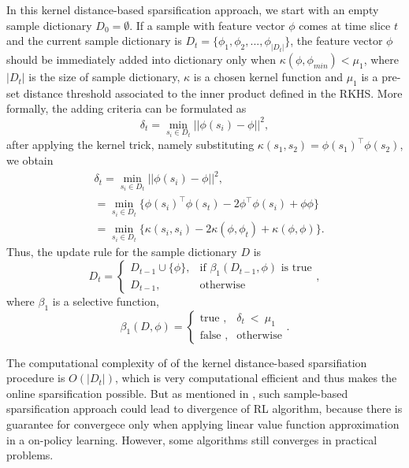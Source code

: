 \documentclass[conference]{IEEEtran}
\begin{document}
In this kernel distance-based sparsification approach, we start with an empty sample dictionary $D_0 = \emptyset$. If a sample with feature vector $\phi$ comes at time slice $t$ and the current sample dictionary is $D_t = \{\phi_1, \phi_2,..., \phi_{|D_t|}\}$, the feature vector $\phi$ should be immediately added into dictionary only when $\kappa(\phi, \phi_{min}) < \mu_1$, where $|D_t|$ is the size of sample dictionary, $\kappa$ is a chosen kernel function and $\mu_1$ is a pre-set distance threshold associated to the inner product defined in the RKHS. More formally, the adding criteria can be formulated as
\begin{equation}
  \delta_t = \min_{s_i\in D_t}||\phi(s_i)-\phi||^2,
\end{equation}
after applying the kernel trick, namely substituting $\kappa(s_1, s_2)=\phi(s_1)^\top\phi(s_2)$, we obtain
\begin{equation}
  \begin{split}
    &\delta_t = \min_{s_i\in D_t}||\phi(s_i)-\phi||^2 ,\\
    &=\min_{s_i\in D_t}\{\phi(s_i)^\top\phi(s_t) - 2\phi^\top\phi(s_i)+\phi\phi\}\\
    &=\min_{s_i\in D_t}\{\kappa(s_i, s_i)-2\kappa(\phi, \phi_t)+\kappa(\phi, \phi)\}.
  \end{split}
\end{equation}
Thus, the update rule for the sample dictionary $D$ is
\begin{equation}
  D_t =
      \begin{cases}
          D_{t-1}\cup \{\phi\}, & \text{if } \beta_1(D_{t-1},\phi)\text{ is true}\\
          D_{t-1},& \text{otherwise}
      \end{cases},
\end{equation}
where $\beta_1$ is a selective function, 
\begin{equation}
  \beta_1(D, \phi) =
      \begin{cases}
			\text{true },& \delta_t\ <\ \mu_1\\
           	\text{false }, & \text{otherwise}
      \end{cases}.
\end{equation}

The computational complexity of of the kernel distance-based sparsifiation procedure is $O(|D_t|)$, which is very computational efficient and thus makes the online sparsification possible. But as mentioned in \cite{tsitsiklis1997analysis}\cite{sutton2009convergent}, such sample-based sparsification approach could lead to divergence of RL algorithm, because there is guarantee for convergece only when applying linear value function approximation in a on-policy learning. However, some algorithms still converges in practical problems.
\end{document}
